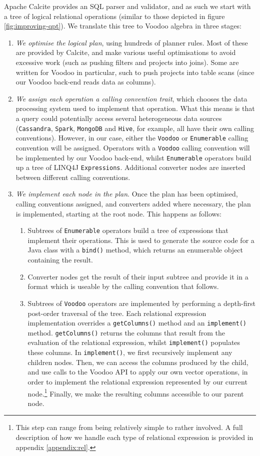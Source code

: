 Apache Calcite provides an SQL parser and validator, and as such we start with a tree of logical relational operations (similar to those depicted in figure \ref{fig:improving-qpt}). We translate this tree to Voodoo algebra in three stages:
\begin{enumerate}
    \item \emph{We optimise the logical plan}, using hundreds of planner rules. Most of these are provided by Calcite, and make various useful optimisations to avoid excessive work (such as pushing filters and projects into joins). Some are written for Voodoo in particular, such to push projects into table scans (since our Voodoo back-end reads data as columns).
    \item \emph{We assign each operation a calling convention trait}, which chooses the data processing system used to implement that operation. What this means is that a query could potentially access several heterogeneous data sources (\texttt{Cassandra}, \texttt{Spark}, \texttt{MongoDB} and \texttt{Hive}, for example, all have their own calling conventions). However, in our case, either the \texttt{Voodoo} or \texttt{Enumerable} calling convention will be assigned. Operators with a \texttt{Voodoo} calling convention will be implemented by our Voodoo back-end, whilst \texttt{Enumerable} operators build up a tree of LINQ4J \texttt{Expressions}. Additional converter nodes are inserted between different calling conventions.
    \item \emph{We implement each node in the plan}. Once the plan has been optimised, calling conventions assigned, and converters added where necessary, the plan is implemented, starting at the root node. This happens as follows:
    \begin{enumerate}
        \item Subtrees of \texttt{Enumerable} operators build a tree of expressions that implement their operations. This is used to generate the source code for a Java class with a \texttt{bind()} method, which returns an enumerable object containing the result.
        \item Converter nodes get the result of their input subtree and provide it in a format which is useable by the calling convention that follows.
        \item Subtrees of \texttt{Voodoo} operators are implemented by performing a depth-first post-order traversal of the tree. Each relational expression implementation overrides a \texttt{getColumns()} method and an \texttt{implement()} method. \texttt{getColumns()} returns the columns that result from the evaluation of the relational expression, whilst \texttt{implement()} populates these columns. In \texttt{implement()}, we first recursively implement any children nodes. Then, we can access the columns produced by the child, and use calls to the Voodoo API to apply our own vector operations, in order to implement the relational expression represented by our current node.\footnote{This step can range from being relatively simple to rather involved. A full description of how we handle each type of relational expression is provided in appendix \ref{appendix:rel}.} Finally, we make the resulting columns accessible to our parent node.

\end{enumerate}
\end{enumerate}
